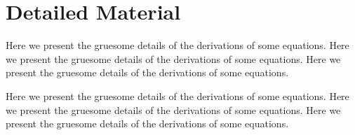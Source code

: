 \chapter{Detailed Material}

Here we present the gruesome details of the derivations of some equations.
Here we present the gruesome details of the derivations of some equations.
Here we present the gruesome details of the derivations of some equations.

Here we present the gruesome details of the derivations of some equations.
Here we present the gruesome details of the derivations of some equations.
Here we present the gruesome details of the derivations of some equations.
